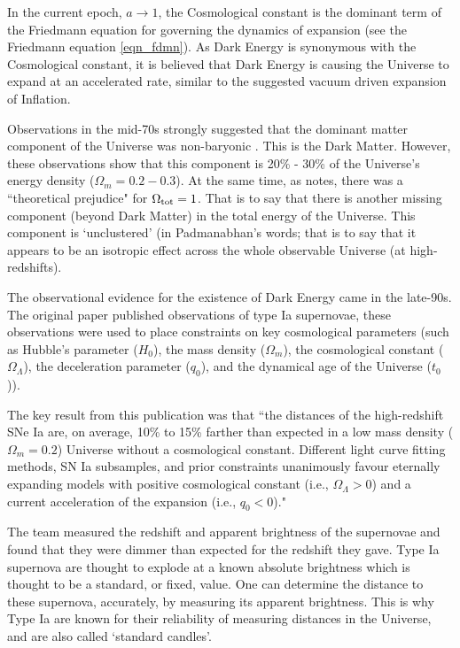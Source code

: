 In the current epoch, $a \rightarrow 1$, the Cosmological constant is the dominant term of the Friedmann equation for governing the dynamics of expansion (see the Friedmann equation \ref{eqn_fdmn}). As Dark Energy is synonymous with the Cosmological constant, it is believed that Dark Energy is causing the Universe to expand at an accelerated rate, similar to the suggested vacuum driven expansion of Inflation.

Observations in the mid-70s strongly suggested that the dominant matter component of the Universe was non-baryonic \citep{bib_pad}. This is the Dark Matter. However, these observations show that this component is 20\% - 30\% of the Universe's energy density ($\Omega_m = 0.2 - 0.3$). At the same time, as \citet{bib_pad} notes, there was a ``theoretical prejudice" for $\Omega_{\rm tot} = 1$. That is to say that there is another missing component (beyond Dark Matter) in the total energy of the Universe. This component is `unclustered' (in Padmanabhan's words; that is to say that it appears to be an isotropic effect across the whole observable Universe (at high-redshifts).

The observational evidence for the existence of Dark Energy came in the late-90s. The original paper \citep{bib_riess} published observations of type Ia supernovae, these observations were used to place constraints on key cosmological parameters (such as Hubble's parameter ($H_0$), the mass density ($\Omega_m$), the cosmological constant ($\Omega_{\Lambda}$), the deceleration parameter ($q_0$), and the dynamical age of the Universe ($t_0$)).

The key result from this publication was that ``the distances of the high-redshift SNe Ia are, on average, 10\% to 15\% farther than expected in a low mass density ($\Omega_m = 0.2$) Universe without a cosmological constant. Different light curve fitting methods, SN Ia subsamples, and prior constraints unanimously favour eternally expanding models with positive cosmological constant (i.e., $\Omega_\Lambda > 0$) and a current acceleration of the expansion (i.e., $q_0 < 0$)."

The team measured the redshift and apparent brightness of the supernovae and found that they were dimmer than expected for the redshift they gave. Type Ia supernova are thought to explode at a known absolute brightness which is thought to be a standard, or fixed, value. One can determine the distance to these supernova, accurately, by measuring its apparent brightness. This is why Type Ia are known for their reliability of measuring distances in the Universe, and are also called `standard candles'.

